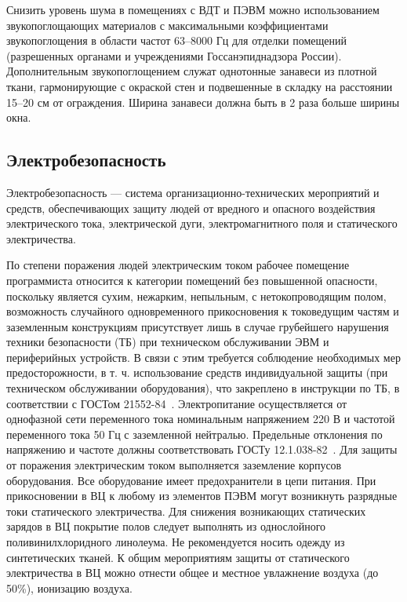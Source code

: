 Снизить уровень шума в помещениях с ВДТ и ПЭВМ можно использованием звукопоглощающих материалов с максимальными коэффициентами звукопоглощения в области частот 63--8000 Гц для отделки помещений (разрешенных органами и учреждениями Госсанэпиднадзора России). Дополнительным звукопоглощением служат однотонные занавеси из плотной ткани, гармонирующие с окраской стен и подвешенные в складку на расстоянии 15--20 см от ограждения. Ширина занавеси должна быть в 2 раза больше ширины окна.

\subsection{Электробезопасность}
\label{sec:bgd:electricity}
Электробезопасность --- система организационно-технических мероприятий и средств, обеспечивающих защиту людей от вредного и опасного воздействия электрического тока, электрической дуги, электромагнитного поля и статического электричества.

По степени поражения людей электрическим током рабочее помещение программиста относится к категории помещений без повышенной опасности, поскольку является сухим, нежарким, непыльным, с нетокопроводящим полом, возможность случайного одновременного прикосновения к токоведущим частям и заземленным конструкциям присутствует лишь в случае грубейшего нарушения техники безопасности (ТБ) при техническом обслуживании ЭВМ и периферийных устройств. В связи с этим требуется соблюдение необходимых мер предосторожности, в т. ч. использование средств индивидуальной защиты (при техническом обслуживании оборудования), что закреплено в инструкции по ТБ, в соответствии с ГОСТом 21552-84~\cite{BGDGost_21552-84}. Электропитание осуществляется от однофазной сети переменного тока номинальным напряжением 220 В и частотой переменного тока 50 Гц с заземленной нейтралью. Предельные отклонения по напряжению и частоте должны соответствовать ГОСТу 12.1.038-82~\cite{BGDGost_12_1_038_82}. Для защиты от поражения электрическим током выполняется заземление корпусов оборудования. Все оборудование имеет предохранители в цепи питания. При прикосновении в ВЦ к любому из элементов ПЭВМ могут возникнуть разрядные токи статического электричества. Для снижения возникающих статических зарядов в ВЦ покрытие полов следует выполнять из однослойного поливинилхлоридного линолеума. Не рекомендуется носить одежду из синтетических тканей. К общим мероприятиям защиты от статического электричества в ВЦ можно отнести общее и местное увлажнение воздуха (до 50\%), ионизацию воздуха.

